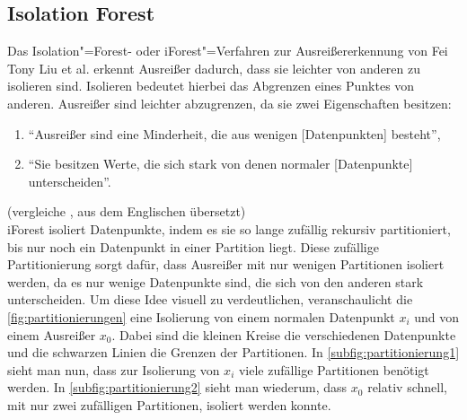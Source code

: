 \subsection{Isolation Forest}
Das Isolation"=Forest- oder iForest"=Verfahren zur Ausreißererkennung von Fei Tony Liu et al. \cite{iForest} erkennt Ausreißer dadurch, dass sie leichter von anderen zu isolieren sind. Isolieren bedeutet hierbei das Abgrenzen eines Punktes von anderen. Ausreißer sind leichter abzugrenzen, da sie zwei Eigenschaften besitzen:
\begin{enumerate}
    \item "`Ausreißer sind eine Minderheit, die aus wenigen [Datenpunkten] besteht"',
    \item "`Sie besitzen Werte, die sich stark von denen normaler [Datenpunkte] unterscheiden"'.
\end{enumerate}
(vergleiche \cite[Ch. 1]{iForest}, aus dem Englischen übersetzt) \\
iForest isoliert Datenpunkte, indem es sie so lange zufällig rekursiv partitioniert, bis nur noch ein Datenpunkt in einer Partition liegt. Diese zufällige Partitionierung sorgt dafür, dass Ausreißer mit nur wenigen Partitionen isoliert werden, da es nur wenige Datenpunkte sind, die sich von den anderen stark unterscheiden. Um diese Idee visuell zu verdeutlichen, veranschaulicht die \autoref{fig:partitionierungen} eine Isolierung von einem normalen Datenpunkt $x_i$ und von einem Ausreißer $x_0$. Dabei sind die kleinen Kreise die verschiedenen Datenpunkte und die schwarzen Linien die Grenzen der Partitionen. In \autoref{subfig:partitionierung1} sieht man nun, dass zur Isolierung von $x_i$ viele zufällige Partitionen benötigt werden. In \autoref{subfig:partitionierung2} sieht man wiederum, dass $x_0$ relativ schnell, mit nur zwei zufälligen Partitionen, isoliert werden konnte.
